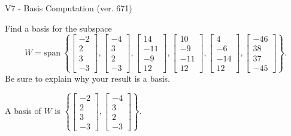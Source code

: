 \begin{exercise}
  \begin{exerciseTitle}V7 - Basis Computation (ver. 671)\end{exerciseTitle}
  \begin{exerciseStatement}
    Find a basis for the subspace 
\[W=\mathrm{span}\ \left\{\left[\begin{array}{r}
-2 \\
2 \\
3 \\
-3
\end{array}\right] , \left[\begin{array}{r}
-4 \\
3 \\
2 \\
-3
\end{array}\right] , \left[\begin{array}{r}
14 \\
-11 \\
-9 \\
12
\end{array}\right] , \left[\begin{array}{r}
10 \\
-9 \\
-11 \\
12
\end{array}\right] , \left[\begin{array}{r}
4 \\
-6 \\
-14 \\
12
\end{array}\right] , \left[\begin{array}{r}
-46 \\
38 \\
37 \\
-45
\end{array}\right]\right\}.\]
 Be sure to explain why your result is a basis.


  \end{exerciseStatement}
  \begin{exerciseAnswer}
   A basis of \(W\) is  \(\left\{\left[\begin{array}{r}
-2 \\
2 \\
3 \\
-3
\end{array}\right] , \left[\begin{array}{r}
-4 \\
3 \\
2 \\
-3
\end{array}\right]\right\}\).
  


  \end{exerciseAnswer}
\end{exercise}
